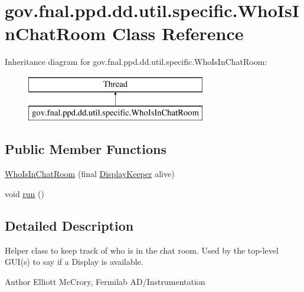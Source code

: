 \hypertarget{classgov_1_1fnal_1_1ppd_1_1dd_1_1util_1_1specific_1_1WhoIsInChatRoom}{\section{gov.\-fnal.\-ppd.\-dd.\-util.\-specific.\-Who\-Is\-In\-Chat\-Room Class Reference}
\label{classgov_1_1fnal_1_1ppd_1_1dd_1_1util_1_1specific_1_1WhoIsInChatRoom}
}
Inheritance diagram for gov.\-fnal.\-ppd.\-dd.\-util.\-specific.\-Who\-Is\-In\-Chat\-Room\-:\begin{figure}[H]
\begin{center}
\leavevmode
\includegraphics[height=2.000000cm]{classgov_1_1fnal_1_1ppd_1_1dd_1_1util_1_1specific_1_1WhoIsInChatRoom}
\end{center}
\end{figure}
\subsection*{Public Member Functions}
\begin{DoxyCompactItemize}
\item 
\hyperlink{classgov_1_1fnal_1_1ppd_1_1dd_1_1util_1_1specific_1_1WhoIsInChatRoom_a19e19a59cf8c3dbc8cec68513b4ee5fb}{Who\-Is\-In\-Chat\-Room} (final \hyperlink{interfacegov_1_1fnal_1_1ppd_1_1dd_1_1interfaces_1_1DisplayKeeper}{Display\-Keeper} alive)
\item 
void \hyperlink{classgov_1_1fnal_1_1ppd_1_1dd_1_1util_1_1specific_1_1WhoIsInChatRoom_a43d765c0c8750b5f9a9f2028a4c282bc}{run} ()
\end{DoxyCompactItemize}


\subsection{Detailed Description}
Helper class to keep track of who is in the chat room. Used by the top-\/level G\-U\-I(s) to say if a Display is available.

\begin{DoxyAuthor}{Author}
Elliott Mc\-Crory, Fermilab A\-D/\-Instrumentation 
\end{DoxyAuthor}


